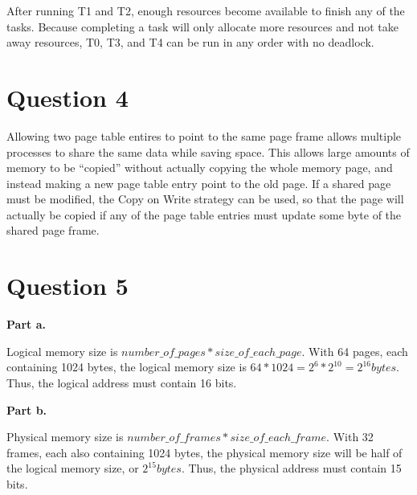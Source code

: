 \documentclass[a4paper]{article}
\begin{document}
	\par After running T1 and T2, enough resources become available to finish
	any of the tasks.
	Because completing a task will only allocate more resources and not take away
	resources, T0, T3, and T4 can be run in any order with no deadlock.

	\section{Question 4}
	\par Allowing two page table entires to point to the same page frame allows
	multiple processes to share the same data while saving space.
	This allows large amounts of memory to be ``copied'' without actually copying
	the whole memory page, and instead making a new page table entry point to the
	old page.
	If a shared page must be modified, the Copy on Write strategy can be used,
	so that the page will actually be copied if any of the page table entries
	must update some byte of the shared page frame.

	\section{Question 5}
	\par \textbf{Part a.}
	\par Logical memory size is $number\_of\_pages * size\_of\_each\_page$.
	With 64 pages, each containing 1024 bytes, the logical memory size is
	$64 * 1024 = 2^{6} * 2^{10} = 2^{16} bytes$.
	Thus, the logical address must contain 16 bits.
	\par \textbf{Part b.}
	\par Physical memory size is $number\_of\_frames * size\_of\_each\_frame$.
	With 32 frames, each also containing 1024 bytes, the physical memory size
	will be half of the logical memory size, or $2^{15} bytes$.
	Thus, the physical address must contain 15 bits.
\end{document}
